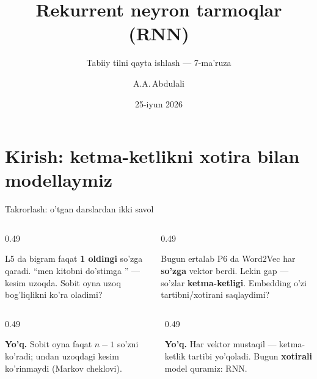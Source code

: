\documentclass[aspectratio=169,11pt]{beamer}
\title[RNN]{Rekurrent neyron tarmoqlar (RNN)}
\subtitle{Tabiiy tilni qayta ishlash --- 7-ma'ruza}
\author[A.A.\,Abdulali]{A.A.\,Abdulali}
\date{25-iyun 2026}
\institute{11:00--12:20 \quad$\cdot$\quad mavzu \textnumero{}7}
\begin{document}

\maketitle

\section[Kirish]{Kirish: ketma-ketlikni xotira bilan modellaymiz}

\begin{frame}{Takrorlash: o'tgan darslardan ikki savol}
  \begin{columns}[T]
    \begin{column}{0.49\textwidth}
      \begin{tcolorbox}[warnbox,title=1-savol]
        \small
        L5 da bigram faqat \textbf{1 oldingi} so'zga qaradi. ``men kitobni
        do'stimga \underline{\hspace{0.7cm}}'' --- kesim uzoqda. Sobit oyna uzoq
        bog'liqlikni ko'ra oladimi?
      \end{tcolorbox}
    \end{column}
    \begin{column}{0.49\textwidth}
      \begin{tcolorbox}[warnbox,title=2-savol]
        \small
        Bugun ertalab P6 da Word2Vec har \textbf{so'zga} vektor berdi. Lekin gap
        --- so'zlar \textbf{ketma-ketligi}. Embedding o'zi tartibni/xotirani
        saqlaydimi?
      \end{tcolorbox}
    \end{column}
  \end{columns}
  \pause
  \vspace{4pt}
  \begin{columns}[T]
    \begin{column}{0.49\textwidth}
      \begin{tcolorbox}[okbox,title=1-javob]
        \small
        \textbf{Yo'q.} Sobit oyna faqat $n{-}1$ so'zni ko'radi; undan uzoqdagi
        kesim ko'rinmaydi (Markov cheklovi).
      \end{tcolorbox}
    \end{column}
    \begin{column}{0.49\textwidth}
      \begin{tcolorbox}[okbox,title=2-javob]
        \small
        \textbf{Yo'q.} Har vektor mustaqil --- ketma-ketlik tartibi yo'qoladi.
        Bugun \textbf{xotirali} model quramiz: RNN.
      \end{tcolorbox}
    \end{column}
  \end{columns}
\end{frame}
\end{document}
